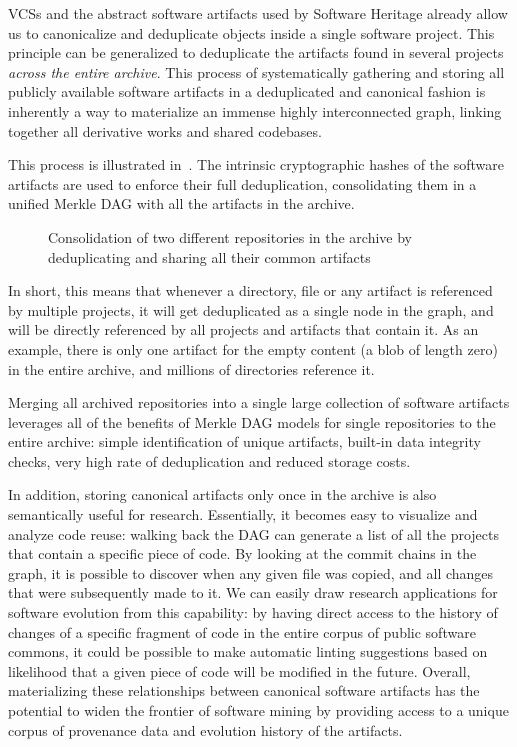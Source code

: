 \glspl{VCS} and the abstract software artifacts used by Software Heritage
already allow us to canonicalize and deduplicate objects inside a single
software project. This principle can be generalized to deduplicate the
artifacts found in several projects \emph{across the entire archive}.
This process of systematically gathering and storing all publicly available
software artifacts in a deduplicated and canonical fashion is inherently a way
to materialize an immense highly interconnected graph, linking together all
derivative works and shared codebases.

This process is illustrated in~. The
intrinsic cryptographic hashes of the software artifacts are used to enforce
their full deduplication, consolidating them in a unified Merkle \gls{DAG} with
all the artifacts in the archive.

\begin{figure}
    \centering
    
    \caption{Consolidation of two different repositories in the archive by
    deduplicating and sharing all their common artifacts}%
    \label{fig:consolidating-archive}
\end{figure}

In short, this means that whenever a directory, file or any artifact is
referenced by multiple projects, it will get deduplicated as a single node in
the graph, and will be directly referenced by all projects and artifacts
that contain it. As an example, there is only one artifact for the empty
content (a blob of length zero) in the entire archive, and millions of
directories reference it.

Merging all archived repositories into a single large collection of software
artifacts leverages all of the benefits of Merkle \gls{DAG} models for single
repositories to the entire archive: simple identification of unique artifacts,
built-in data integrity checks, very high rate of deduplication and reduced
storage costs.

In addition, storing canonical artifacts only once in the archive is also
semantically useful for research. Essentially, it becomes easy to visualize
and analyze code reuse: walking back the \gls{DAG} can generate a list of all
the projects that contain a specific piece of code. By looking at the commit
chains in the graph, it is possible to discover when any given file was copied,
and all changes that were subsequently made to it.
We can easily draw research applications for software evolution from this
capability: by having direct access to the history of changes of a specific
fragment of code in the entire corpus of public software commons, it could be
possible to make automatic linting suggestions based on likelihood that a given
piece of code will be modified in the future. Overall, materializing these
relationships between canonical software artifacts has the potential to widen
the frontier of software mining by providing access to a unique corpus of
provenance data and evolution history of the artifacts.
